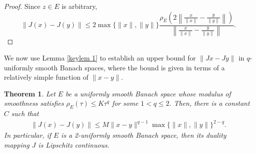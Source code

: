 \documentclass[12pt,a4paper]{amsart}
\newtheorem{theorem}{Theorem}[section]
\theoremstyle{definition}
\numberwithin{equation}{section}
\begin{document}
\begin{proof}
Since $z\in E$ is arbitrary,
\[
\| J(x) - J(y) \| \leq 2\max\{ \| x \|, \| y \| \}  \frac{\rho_E \left( 2 \left\| \frac{x}{\| x \|} - \frac{y}{\| y \|} \right\| \right)}{\left\| \frac{x}{\| x \|} - \frac{y}{\| y \|} \right\|}.
\]
\end{proof}

We now use Lemma \ref{keylem 1} to establish an upper bound for \(\|Jx - Jy\|\) in $q$-uniformly smooth Banach spaces, where the bound is given in terms of a relatively simple function of \(\|x - y\|\).
\begin{theorem}\label{main 1}
  Let $E$ be a uniformly smooth Banach space whose modulus of smoothness satisfies $\rho_{E}(\tau) \leq K\tau^q$ for some $1< q \leq 2$. Then, there is a constant $C$ such that
  \begin{align}\label{J inequa3}
    \| J(x) - J(y) \| \leq M  \| x - y \|^{q - 1} \max\{ \| x \|, \| y \| \}^{2 - q}.
  \end{align}
In particular, if \( E \) is a 2-uniformly smooth Banach space, then its duality mapping \( J \) is Lipschitz continuous.
\end{theorem}
\end{document}

